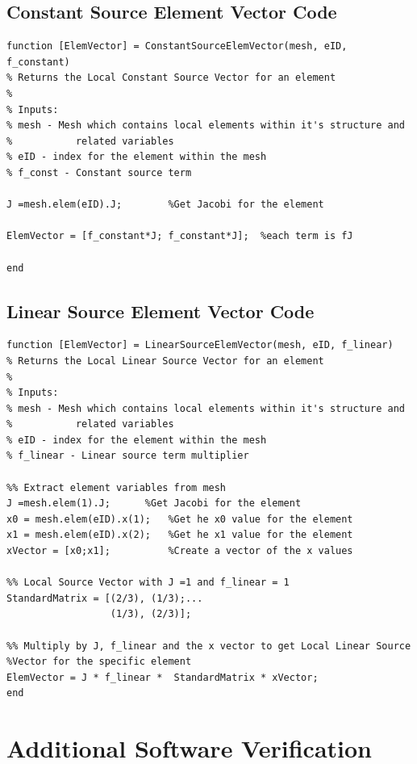 \documentclass[11pt]{article}
\begin{document}
\begin{appendices}
\subsection{Constant Source Element Vector Code}\label{ap:CSV}
\begin{lstlisting}
function [ElemVector] = ConstantSourceElemVector(mesh, eID, f_constant)
% Returns the Local Constant Source Vector for an element
%
% Inputs:
% mesh - Mesh which contains local elements within it's structure and
%           related variables
% eID - index for the element within the mesh
% f_const - Constant source term 

J =mesh.elem(eID).J;        %Get Jacobi for the element

ElemVector = [f_constant*J; f_constant*J];  %each term is fJ

end
\end{lstlisting}
\clearpage

\subsection{Linear Source Element Vector Code}\label{ap:LSV}
\begin{lstlisting}
function [ElemVector] = LinearSourceElemVector(mesh, eID, f_linear)
% Returns the Local Linear Source Vector for an element
%
% Inputs:
% mesh - Mesh which contains local elements within it's structure and
%           related variables
% eID - index for the element within the mesh
% f_linear - Linear source term multiplier

%% Extract element variables from mesh
J =mesh.elem(1).J;      %Get Jacobi for the element
x0 = mesh.elem(eID).x(1);   %Get he x0 value for the element
x1 = mesh.elem(eID).x(2);   %Get he x1 value for the element
xVector = [x0;x1];          %Create a vector of the x values

%% Local Source Vector with J =1 and f_linear = 1
StandardMatrix = [(2/3), (1/3);...
                  (1/3), (2/3)];
              
%% Multiply by J, f_linear and the x vector to get Local Linear Source 
%Vector for the specific element
ElemVector = J * f_linear *  StandardMatrix * xVector;
end
\end{lstlisting}


\clearpage
\section{Additional Software Verification}

\end{appendices}
\end{document}
